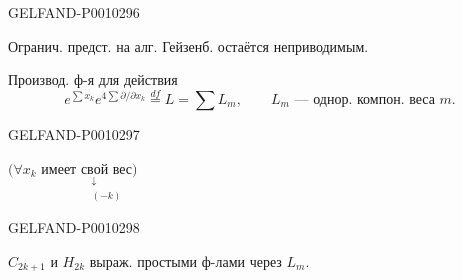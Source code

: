 \begin{GelfandAdjacentEvidence}{GELFAND-P001029}{6}


Огранич. предст. на алг. Гейзенб. остаётся неприводимым.

Производ. ф-я для действия
\[
e^{\sum x_k}e^{4\sum\partial/\partial x_k}\overset{df}{=}L=\sum L_m,
\qquad L_m\text{ --- однор. компон. веса }m.
\]
\end{GelfandAdjacentEvidence}
\begin{GelfandAdjacentEvidence}{GELFAND-P001029}{7}


$\bigl(\forall x_k\text{ имеет }\underset{\substack{\downarrow\\(-k)}}{\text{свой вес}}\bigr)$
\end{GelfandAdjacentEvidence}
\begin{GelfandAdjacentEvidence}{GELFAND-P001029}{8}

\end{GelfandAdjacentEvidence}


$C_{2k+1}$ и $H_{2k}$ выраж. простыми ф-лами через $L_m$.


